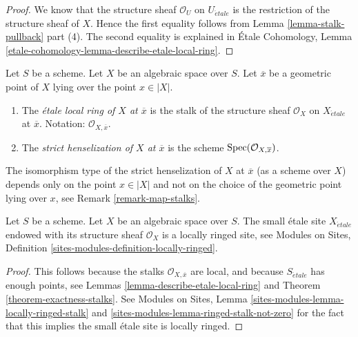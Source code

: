 \begin{proof}
We know that the structure sheaf $\mathcal{O}_U$ on
$U_{\acute{e}tale}$ is the restriction of the structure sheaf of $X$.
Hence the first equality follows from
Lemma \ref{lemma-stalk-pullback} part (4).
The second equality is explained in
\'Etale Cohomology,
Lemma \ref{etale-cohomology-lemma-describe-etale-local-ring}.
\end{proof}

\begin{definition}
\label{definition-etale-local-rings}
Let $S$ be a scheme.
Let $X$ be an algebraic space over $S$.
Let $\overline{x}$ be a geometric point of $X$ lying over the point
$x \in |X|$.
\begin{enumerate}
\item The {\it \'etale local ring of $X$ at $\overline{x}$}
is the stalk of the structure sheaf $\mathcal{O}_X$ on $X_{\acute{e}tale}$
at $\overline{x}$.
Notation: $\mathcal{O}_{X, \overline{x}}$.
\item The {\it strict henselization of $X$ at $\overline{x}$}
is the scheme $\mathop{\rm Spec}(\mathcal{O}_{X, \overline{x}})$.
\end{enumerate}
\end{definition}

\noindent
The isomorphism type of the strict henselization of $X$ at $\overline{x}$
(as a scheme over $X$) depends only on the point $x \in |X|$ and not on
the choice of the geometric point lying over $x$, see
Remark \ref{remark-map-stalks}.

\begin{lemma}
\label{lemma-etale-site-locally-ringed}
Let $S$ be a scheme.
Let $X$ be an algebraic space over $S$.
The small \'etale site $X_{\acute{e}tale}$ endowed with its
structure sheaf $\mathcal{O}_X$ is a locally ringed site, see
Modules on Sites, Definition \ref{sites-modules-definition-locally-ringed}.
\end{lemma}

\begin{proof}
This follows because the stalks
$\mathcal{O}_{X, \overline{x}}$ are
local, and because $S_{\acute{e}tale}$ has enough points, see
Lemmas \ref{lemma-describe-etale-local-ring} and
Theorem \ref{theorem-exactness-stalks}.
See
Modules on Sites, Lemma \ref{sites-modules-lemma-locally-ringed-stalk} and
\ref{sites-modules-lemma-ringed-stalk-not-zero}
for the fact that this implies the small \'etale site is locally ringed.
\end{proof}





